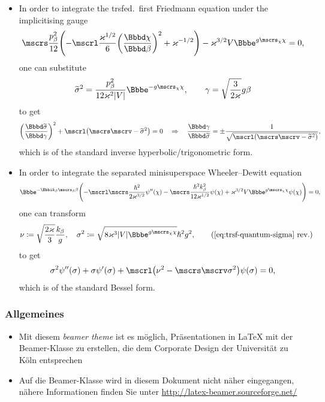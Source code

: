 \documentclass[9pt]{beamer}
\begin{document}
\begin{itemize}
\item
In order to integrate the trsfed.\ first Friedmann equation under the
implicitising gauge
\begin{align}
\mscrs\frac{p_\beta^2}{12}\rbr{
-\mscrl\frac{\varkappa^{1/2}}{6}\rbr{\frde{\chi}{\beta}}^2
+\varkappa^{-1/2}}
-\varkappa^{3/2}V\ee^{g\mscrs_\chi\chi} = 0,
\end{align}
one can substitute
\begin{align}
\widetilde{\sigma}^2 = \frac{p_\beta^2}{12\varkappa^2 \vbr{V}}
\ee^{-g\mscrs_\chi\chi},
\qquad
\gamma = \sqrt{\frac{3}{2\varkappa}}g\beta
\end{align}
to get
\begin{align}
\rbr{\frde{\widetilde{\sigma}}{\gamma}}^2
+\mscrl\rbr{\mscrs\mscrv - \widetilde{\sigma}^2} = 0
\quad\Rightarrow\quad
\frde{\gamma}{\widetilde{\sigma}} = \pm
\frac{1}{\sqrt{\mscrl\rbr{\mscrs\mscrv - \widetilde{\sigma}^2}}},
\end{align}
which is of the standard inverse hyperbolic/trigonometric form.

\item
In order to integrate the separated minisuperspace Wheeler--Dewitt equation
\begin{align}
\ee^{-\ii k_\beta\mscrs_\beta\beta}\rbr{
-\mscrl\mscrs\frac{\hslash^2}{2\varkappa^{3/2}}\rfun{\psi''}{\chi}
-\mscrs\frac{\hslash^2k_\beta^2}{12\varkappa^{1/2}}\rfun{\psi}{\chi}
+\varkappa^{3/2}V\ee^{g\mscrs_\chi\chi}\rfun{\psi}{\chi}
} = 0,
\end{align}
one can transform
\begin{align}
\nu &\coloneqq \sqrt{\frac{2\varkappa}{3}}\frac{k_\beta}{g},\quad
\sigma^2 \coloneqq 
\sqrt{8\varkappa^3\vbr{V}\ee^{g\mscrs_\chi\chi}}{\hslash^2 g^2},
\tag{\ref{eq:trsf-quantum-sigma} rev.}
\end{align}
to get
\begin{align}
\sigma^2\rfun{\psi''}{\sigma}
+\sigma\rfun{\psi'}{\sigma}
+\mscrl\rbr{\nu^2-\mscrs\mscrv\sigma^2}\rfun{\psi}{\sigma} = 0,
\end{align}
which is of the standard Bessel form.
\end{itemize}

\begin{frame}
  \frametitle{Allgemeines}

  \begin{itemize}
  \item Mit diesem \emph{beamer theme} ist es möglich, Präsentationen in
    \LaTeX{} mit der Beamer-Klasse zu erstellen, die dem Corporate Design der
    Universität zu Köln entsprechen
  \item Auf die Beamer-Klasse wird in diesem Dokument nicht näher eingegangen,
    nähere Informationen finden Sie unter
    \url{http://latex-beamer.sourceforge.net/}
  \end{itemize}

\end{frame}
\end{document}
